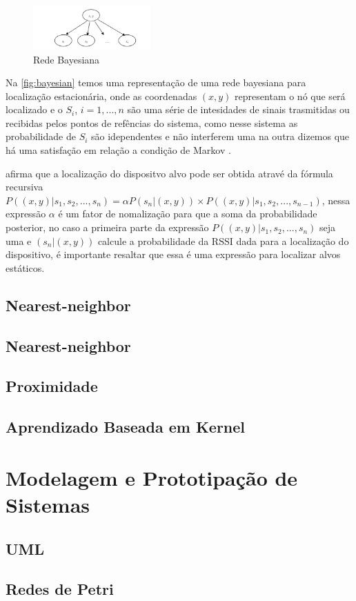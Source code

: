     \begin{figure}[H]
              \caption{\label{fig:bayesian}{Rede Bayesiana}}
              \centering
              \includegraphics[width=0.4\textwidth]{Figuras/bayesian_network.PNG}
        \end{figure}

        Na \autoref{fig:bayesian} temos uma representação de uma rede bayesiana para localização estacionária, onde as coordenadas $(x,y)$ representam o nó que será localizado e o $S_i$, $i=1,...,n$ são uma série de intesidades de sinais trasmitidas ou recibidas pelos pontos de refências do sistema, como nesse sistema as probabilidade de $S_i$ são idependentes e não interferem uma na outra dizemos que há uma satisfação em relação a condição de Markov \cite{rfid2009review}.
        \par
        \citeauthor{rfid2009review} afirma que a localização do dispositvo alvo pode ser obtida atravé da fórmula recursiva 
        $P((x,y) | s_1, s_2, ..., s_n) = \alpha P(s_n | (x,y)) \times P((x,y) | s_1,s_2, ...,s_{n-1})$, nessa expressão $\alpha$ é um fator de nomalização para que a soma da probabilidade posterior, no caso a primeira parte da expressão $P((x,y) | s_1, s_2, ..., s_n)$ seja uma e $(s_n | (x,y))$ calcule a probabilidade da RSSI dada para a localização do dispositivo, é importante resaltar que essa é uma expressão para localizar alvos estáticos. 
    \subsection{Nearest-neighbor}
    \subsection{Nearest-neighbor}
    \subsection{Proximidade}
    \subsection{Aprendizado Baseada em Kernel}
\section{Modelagem e Prototipação de Sistemas}
    \subsection{UML}
    \subsection{Redes de Petri}